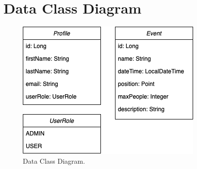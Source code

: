 \section{Data Class Diagram}
\begin{figure}[h!]
	\centering
	\includegraphics[width=0.8\linewidth]{diagrammi/classdiagram.png}
	\caption{Data Class Diagram.}
	\label{fig:DataClassDiagram}
\end{figure}
